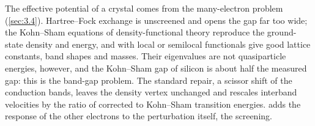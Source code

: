 The effective potential of a crystal comes from the many-electron problem (\cref{sec:3.4}). Hartree--Fock exchange is unscreened and opens the gap far too wide; the Kohn--Sham equations of density-functional theory reproduce the ground-state density and energy, and with local or semilocal functionals give good lattice constants, band shapes and masses. Their eigenvalues are not quasiparticle energies, however, and the Kohn--Sham gap of silicon is about half the measured gap: this is the band-gap problem. The standard repair, a scissor shift of the conduction bands, leaves the density vertex unchanged and rescales interband velocities by the ratio of corrected to Kohn--Sham transition energies.  adds the response of the other electrons to the perturbation itself, the screening.
